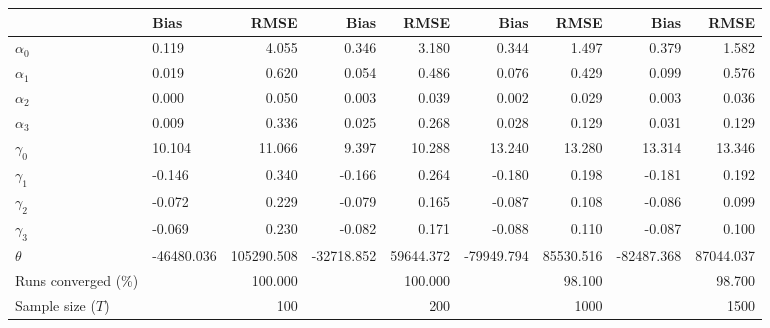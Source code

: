 
\begin{tabular}[t]{llrrrrrrr}
\toprule
  & Bias & RMSE & Bias & RMSE & Bias & RMSE & Bias & RMSE\\
\midrule
$\alpha_{0}$ & 0.119 & 4.055 & 0.346 & 3.180 & 0.344 & 1.497 & 0.379 & 1.582\\
$\alpha_{1}$ & 0.019 & 0.620 & 0.054 & 0.486 & 0.076 & 0.429 & 0.099 & 0.576\\
$\alpha_{2}$ & 0.000 & 0.050 & 0.003 & 0.039 & 0.002 & 0.029 & 0.003 & 0.036\\
$\alpha_{3}$ & 0.009 & 0.336 & 0.025 & 0.268 & 0.028 & 0.129 & 0.031 & 0.129\\
$\gamma_{0}$ & 10.104 & 11.066 & 9.397 & 10.288 & 13.240 & 13.280 & 13.314 & 13.346\\
$\gamma_{1}$ & -0.146 & 0.340 & -0.166 & 0.264 & -0.180 & 0.198 & -0.181 & 0.192\\
$\gamma_{2}$ & -0.072 & 0.229 & -0.079 & 0.165 & -0.087 & 0.108 & -0.086 & 0.099\\
$\gamma_{3}$ & -0.069 & 0.230 & -0.082 & 0.171 & -0.088 & 0.110 & -0.087 & 0.100\\
$\theta$ & -46480.036 & 105290.508 & -32718.852 & 59644.372 & -79949.794 & 85530.516 & -82487.368 & 87044.037\\
Runs converged (\%) &  & 100.000 &  & 100.000 &  & 98.100 &  & 98.700\\
Sample size ($T$) &  & 100 &  & 200 &  & 1000 &  & 1500\\
\bottomrule
\end{tabular}
